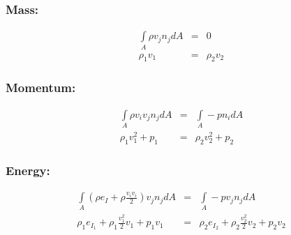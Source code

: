 \subsubsection{Mass:}
 \begin{eqnarray}        
    \int\limits_A \rho v_j n_j dA &=& 0 \\ 
    \rho_1 v_1  &=&\rho_2 v_2 
\end{eqnarray}        

     
\subsubsection{Momentum:}
\begin{eqnarray}        
    \int\limits_A \rho v_i v_j n_j dA &=& \int\limits_A - p n_i dA \\ 
    \rho_1 v^2_1 + p_1&=&  \rho_2 v^2_2 + p_2
\end{eqnarray}        

\subsubsection{Energy:}
\begin{eqnarray}        
     \int\limits_A (\rho e_I + \rho\frac{v_i v_i}{2}) v_j n_j dA &=& \int\limits_A - p v_j n_j dA \\ 
     \rho_1 e_{I_1} + \rho_1\frac{v^2_1 }{2} v_1  + p_1 v_1 &=& \rho_2 e_{I_2} + \rho_2\frac{v^2_2 }{2} v_2 +  p_2 v_2  
\end{eqnarray}        



